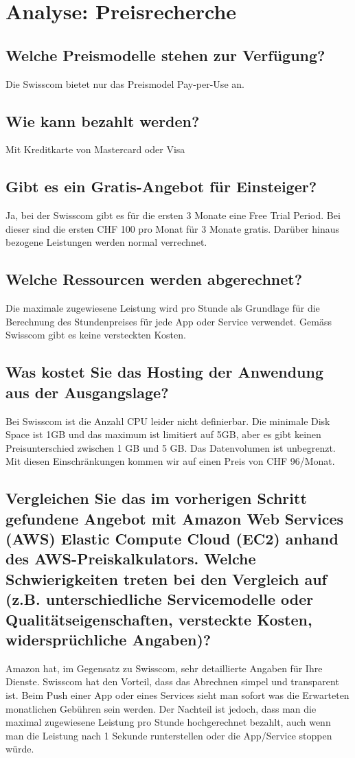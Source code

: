 \documentclass[11pt,titlepage]{article}
\begin{document}
\section{Analyse: Preisrecherche}
\label{sec:analysePreisrecherche}
\subsection{Welche Preismodelle stehen zur Verfügung?}
Die Swisscom bietet nur das Preismodel Pay-per-Use an.
\subsection{Wie kann bezahlt werden?}
Mit Kreditkarte von Mastercard oder Visa
\subsection{Gibt es ein Gratis-Angebot für Einsteiger?}
Ja, bei der Swisscom gibt es für die ersten 3 Monate eine Free Trial Period. Bei dieser sind die ersten CHF 100 pro Monat für 3 Monate gratis. Darüber hinaus bezogene Leistungen werden normal verrechnet.
\subsection{Welche Ressourcen werden abgerechnet?}
Die maximale zugewiesene Leistung wird pro Stunde als Grundlage für die Berechnung des Stundenpreises für jede App oder Service verwendet. 
Gemäss Swisscom gibt es keine versteckten Kosten.
\subsection{Was kostet Sie das Hosting der Anwendung aus der Ausgangslage?}
Bei Swisscom ist die Anzahl CPU leider nicht definierbar. Die minimale Disk Space ist 1GB und das maximum ist limitiert auf 5GB, aber es gibt keinen Preisunterschied zwischen 1 GB und 5 GB. Das Datenvolumen ist unbegrenzt. Mit diesen Einschränkungen kommen wir auf einen Preis von CHF 96/Monat.
\subsection{Vergleichen Sie das im vorherigen Schritt gefundene Angebot mit Amazon Web Services (AWS) Elastic Compute Cloud (EC2) anhand des AWS-Preiskalkulators. Welche Schwierigkeiten treten bei den Vergleich auf (z.B. unterschiedliche Servicemodelle oder Qualitätseigenschaften, versteckte Kosten, widersprüchliche Angaben)?}
Amazon hat, im Gegensatz zu Swisscom, sehr detaillierte Angaben für Ihre Dienste. Swisscom hat den Vorteil, dass das Abrechnen simpel und transparent ist. Beim Push einer App oder eines Services sieht man sofort was die Erwarteten monatlichen Gebühren sein werden. Der Nachteil ist jedoch, dass man die maximal zugewiesene Leistung pro Stunde hochgerechnet bezahlt, auch wenn man die Leistung nach 1 Sekunde runterstellen oder die App/Service stoppen würde.
\end{document}
